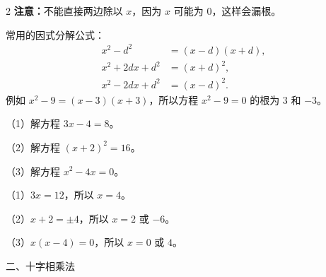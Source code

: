 \documentclass[UTF8,fontset=windows,zihao=-4]{ctexart}
\newcommand{\sheet}[1]{\begin{center}\heiti\fontsize{24}{30}\selectfont #1\end{center}\vspace{3mm}}
\newcommand{\topic}[1]{\par\vspace{7pt}{\heiti\fontsize{17}{23}\selectfont #1}\par\vspace{2pt}}
\begin{document}
\begin{multicols*}{2}
\textbf{注意：}不能直接两边除以 $x$，因为 $x$ 可能为 $0$，这样会漏根。

常用的因式分解公式：
\[
\begin{aligned}
x^2-d^2&=(x-d)(x+d),\\
x^2+2dx+d^2&=(x+d)^2,\\
x^2-2dx+d^2&=(x-d)^2.
\end{aligned}
\]
例如 $x^2-9=(x-3)(x+3)$，所以方程 $x^2-9=0$ 的根为 $3$ 和 $-3$。
\topic{练习}
（1）解方程 $3x-4=8$。

（2）解方程 $(x+2)^2=16$。

（3）解方程 $x^2-4x=0$。
\topic{解答}
（1）$3x=12$，所以 $x=4$。

（2）$x+2=\pm4$，所以 $x=2$ 或 $-6$。

（3）$x(x-4)=0$，所以 $x=0$ 或 $4$。
\end{multicols*}
\newpage
\sheet{二、十字相乘法}
\end{document}
